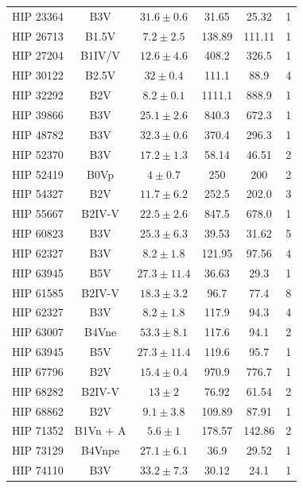 \begin{small}
\begin{longtable}{|cccccc|}
        HIP 23364 & B3V &$ 31.6 \pm 0.6 $& 31.65 & 25.32 & 1 \\ 
        HIP 26713 & B1.5V &$ 7.2 \pm 2.5 $& 138.89 & 111.11 & 1 \\ 
        HIP 27204 & B1IV/V & $12.6 \pm 4.6$ & 408.2 & 326.5 & 1 \\
    HIP 30122 & B2.5V & $32 \pm 0.4$ & 111.1 & 88.9 & 4 \\
    HIP 32292 & B2V & $8.2 \pm 0.1$ & 1111.1 & 888.9 & 1 \\
    HIP 39866 & B3V & $25.1 \pm 2.6$ & 840.3 & 672.3 & 1 \\
    HIP 48782 & B3V & $32.3 \pm 0.6$ & 370.4 & 296.3 & 1 \\
        HIP 52370 & B3V &$ 17.2 \pm 1.3 $& 58.14 & 46.51 & 2 \\ 
        HIP 52419 & B0Vp &$ 4 \pm 0.7 $& 250 & 200 & 2 \\ 
    HIP 54327 & B2V & $11.7 \pm 6.2$ & 252.5 & 202.0 & 3 \\
    HIP 55667 & B2IV-V & $22.5 \pm 2.6$ & 847.5 & 678.0 & 1 \\
        HIP 60823 & B3V &$ 25.3 \pm 6.3 $& 39.53 & 31.62 & 5 \\ 
        HIP 62327 & B3V &$ 8.2 \pm 1.8 $& 121.95 & 97.56 & 4 \\
        HIP 63945 & B5V &$ 27.3 \pm 11.4 $& 36.63 & 29.3 & 1 \\  
    HIP 61585 & B2IV-V & $18.3 \pm 3.2$ & 96.7 & 77.4 & 8 \\
    HIP 62327 & B3V & $8.2 \pm 1.8$ & 117.9 & 94.3 & 4 \\
    HIP 63007 & B4Vne & $53.3 \pm 8.1$ & 117.6 & 94.1 & 2 \\
    HIP 63945 & B5V & $27.3 \pm 11.4$ & 119.6 & 95.7 & 1 \\
    HIP 67796 & B2V & $15.4 \pm 0.4$ & 970.9 & 776.7 & 1 \\
        HIP 68282 & B2IV-V &$ 13 \pm 2 $& 76.92 & 61.54 & 2\\ 
        HIP 68862 & B2V &$ 9.1 \pm 3.8 $& 109.89 & 87.91 & 1 \\ 
        HIP 71352 & B1Vn + A &$ 5.6 \pm 1 $& 178.57 & 142.86 & 2 \\ 
        HIP 73129 & B4Vnpe &$ 27.1 \pm 6.1 $& 36.9 & 29.52 & 1 \\ 
        HIP 74110 & B3V &$ 33.2 \pm 7.3 $& 30.12 & 24.1 & 1 \\ 

\end{longtable}
\end{small}
